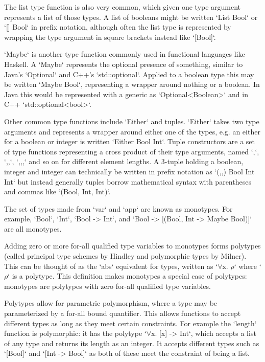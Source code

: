 \documentclass[a4paper,fleqn,12pt]{article}
\begin{document}
The list type function is also very common, which given one type argument represents a list of those types. A list of booleans might be written `List Bool` or `[] Bool` in prefix notation, although often the list type is represented by wrapping the type argument in square brackets instead like `[Bool]`.

`Maybe` is another type function commonly used in functional languages like Haskell. A `Maybe` represents the optional presence of something, similar to Java’s `Optional` and C++’s `std::optional`. Applied to a boolean type this may be written `Maybe Bool`, representing a wrapper around nothing or a boolean. In Java this would be represented with a generic as `Optional<Boolean>` and in C++ `std::optional<bool>`.

Other common type functions include `Either` and tuples. `Either` takes two type arguments and represents a wrapper around either one of the types, e.g. an either for a boolean or integer is written `Either Bool Int`. Tuple constructors are a set of type functions representing a cross product of their type arguments, named `,`, `,,`, `,,,` and so on for different element lengths. A 3-tuple holding a boolean, integer and integer can technically be written in prefix notation as `(,,) Bool Int Int` but instead generally tuples borrow mathematical syntax with parentheses and commas like `(Bool, Int, Int)`.

The set of types made from `var` and `app` are known as monotypes. For example, `Bool`, `Int`, `Bool -> Int`, and `Bool -> [(Bool, Int -> Maybe Bool)]` are all monotypes.

Adding zero or more for-all qualified type variables to monotypes forms polytypes (called principal type schemes by Hindley and polymorphic types by Milner). This can be thought of as the `abs` equivalent for types, written as `$\forall$x. $\rho$` where `$\rho$` is a polytype. This definition makes monotypes a special case of polytypes: monotypes are polytypes with zero for-all qualified type variables.

Polytypes allow for parametric polymorphism, where a type may be parameterized by a for-all bound quantifier. This allows functions to accept different types as long as they meet certain constraints. For example the `length` function is polymorphic: it has the polytype `$\forall$x. [x] -> Int`, which accepts a list of any type and returns its length as an integer. It accepts different types such as `[Bool]` and `[Int -> Bool]` as both of these meet the constraint of being a list.
\end{document}

